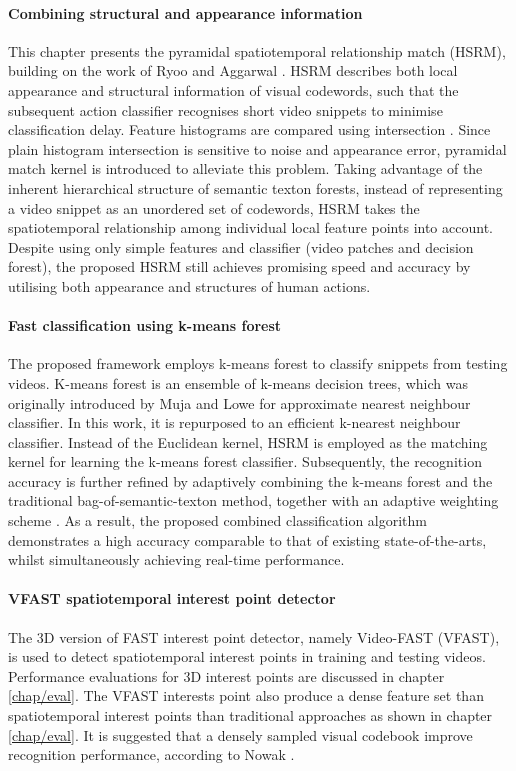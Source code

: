 \paragraph{Combining structural and appearance information} This chapter presents the pyramidal spatiotemporal relationship match (HSRM), building on the work of Ryoo and Aggarwal \cite{Ryoo2009}. HSRM describes both local appearance and structural information of visual codewords, such that the subsequent action classifier recognises short video snippets to minimise classification delay. Feature histograms are compared using intersection \cite{Ryoo2009}. Since plain histogram intersection is sensitive to noise and appearance error, pyramidal match kernel \cite{Grauman2005} is introduced to alleviate this problem. Taking advantage of the inherent hierarchical structure of semantic texton forests, instead of representing a video snippet as an unordered set of codewords, HSRM takes the spatiotemporal relationship among individual local feature points into account. Despite using only simple features and classifier (video patches and decision forest), the proposed HSRM still achieves promising speed and accuracy by utilising both appearance and structures of human actions. 


\paragraph{Fast classification using k-means forest} The proposed framework employs k-means forest to classify snippets from testing videos. K-means forest is an ensemble of k-means decision trees, which was originally introduced by Muja and Lowe \cite{Muja2009} for approximate nearest neighbour classifier. In this work, it is repurposed to an efficient k-nearest neighbour classifier. Instead of the Euclidean kernel, HSRM is employed as the matching kernel for learning the k-means forest classifier. Subsequently, the recognition accuracy is further refined by adaptively combining the k-means forest and the traditional bag-of-semantic-texton method, together with an adaptive weighting scheme \cite{Shotton2008}. As a result, the proposed combined classification algorithm demonstrates a high accuracy comparable to that of existing state-of-the-arts, whilst simultaneously achieving real-time performance. 

\paragraph{VFAST spatiotemporal interest point detector} The 3D version of FAST interest point detector, namely Video-FAST (VFAST), is used to detect spatiotemporal interest points in training and testing videos. Performance evaluations for 3D interest points are discussed in chapter \ref{chap/eval}. The VFAST interests point also produce a dense feature set than spatiotemporal interest points than traditional approaches as shown in chapter \ref{chap/eval}. It is suggested that a densely sampled visual codebook improve recognition performance, according to Nowak \etal \cite{Nowak2006}.

